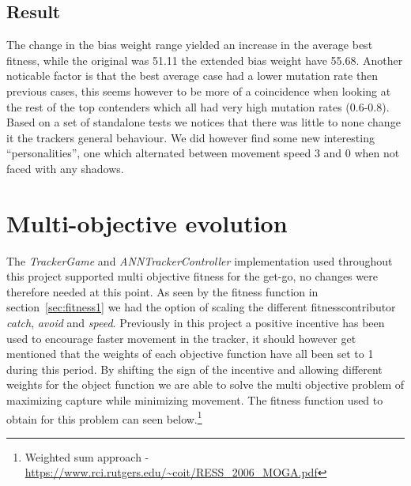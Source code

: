 \documentclass[12pt]{article}
\begin{document}
	\subsection{Result}
		The change in the bias weight range yielded an increase in the average best fitness, while the original was 51.11 the extended bias weight have 55.68. Another noticable factor is that the best average case had a lower mutation rate then previous cases, this seems however to be more of a coincidence when looking at the rest of the top contenders which all had very high mutation rates (0.6-0.8). 
		Based on a set of standalone tests we notices that there was little to none change it the trackers general behaviour. We did however find some new interesting "`personalities"', one which alternated between movement speed 3 and 0 when not faced with any shadows. 
		
\section{Multi-objective evolution}
	The \textit{TrackerGame} and \textit{ANNTrackerController} implementation used throughout this project supported multi objective fitness for the get-go, no changes were therefore needed at this point. As seen by the fitness function in section~\ref{sec:fitness1} we had the option of scaling the different fitnesscontributor \textit{catch}, \textit{avoid} and \textit{speed}. Previously in this project a positive incentive has been used to encourage faster movement in the tracker, it should however get mentioned that the weights of each objective function have all been set to 1 during this period. By shifting the sign of the incentive and allowing different weights for the object function we are able to solve the multi objective problem of maximizing capture while minimizing movement. The fitness function used to obtain for this problem can seen below.\footnote{Weighted sum approach - \url{https://www.rci.rutgers.edu/~coit/RESS_2006_MOGA.pdf}}
	
\end{document}
